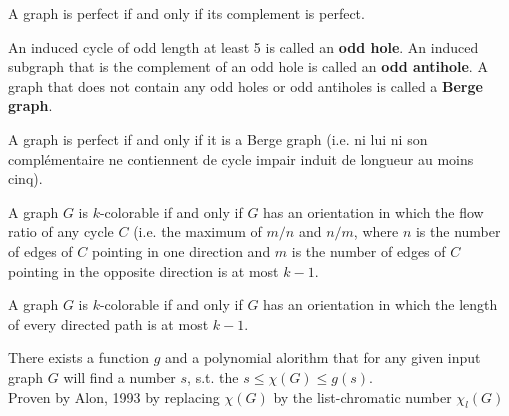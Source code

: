 \begin{theorem}
A graph is perfect if and only if its complement is perfect.
\end{theorem}

\begin{defin}
An induced cycle of odd length at least 5 is called an \textbf{odd hole}. An induced subgraph that is the complement of
an odd hole is called an \textbf{odd antihole}. A graph that does
not contain any odd holes or odd antiholes is called a \textbf{Berge graph}.
\end{defin}

\begin{theorem}
A graph is perfect if and only if it is a Berge graph (i.e. ni lui ni son complémentaire
ne contiennent de cycle impair induit de longueur au moins cinq).
\end{theorem}

\begin{theorem}[Minty, 1962]
A graph $G$ is $k$-colorable if and only if $G$ has an orientation in which the flow ratio of any cycle $C$ (i.e.
the maximum of $m/n$ and $n/m$, where $n$ is the number of edges of $C$ pointing in one direction and $m$
is the number of edges of $C$ pointing in the opposite direction is at most $k-1$.
\end{theorem}

\begin{theorem}
A graph $G$ is $k$-colorable if and only if $G$ has an orientation in which the length of every directed path is
at most $k-1$.
\end{theorem}

There exists a function $g$ and a polynomial alorithm that for any given input graph $G$ will find
a number $s$, s.t. the $s\leq\chi(G)\leq g(s)$.\\
Proven by Alon, 1993 by replacing $\chi(G)$ by the list-chromatic number $\chi_l(G)$













